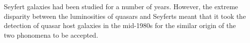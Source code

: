Seyfert galaxies \citep{seyfert43}  had been studied for a number of years. 
However, the extreme disparity between the luminosities of quasars and Seyferts meant that it took the detection of quasar host galaxies in the mid-1980s for the similar origin of the two phonomena to be accepted.    
